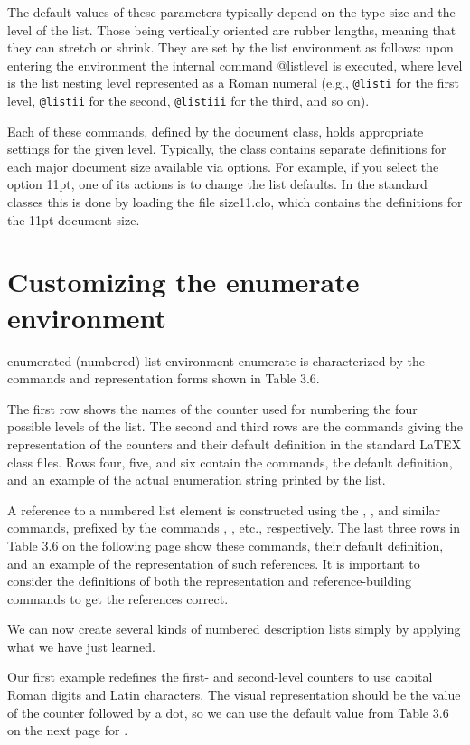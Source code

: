 The default values of these parameters typically depend on the type size and
the level of the list. Those being vertically oriented are rubber lengths, meaning
that they can stretch or shrink. They are set by the list environment as follows:
upon entering the environment the internal command @listlevel is executed,
where level is the list nesting level represented as a Roman numeral (e.g.,
\texttt{@listi} for the first level, \texttt{@listii} for the second, \texttt{@listiii} for the third, and
so on). 

Each of these commands, defined by the document class, holds appropriate
settings for the given level. Typically, the class contains separate definitions
for each major document size available via options. For example, if you select
the option 11pt, one of its actions is to change the list defaults. In the standard
classes this is done by loading the file size11.clo, which contains the definitions
for the 11pt document size.

\section{Customizing the enumerate environment}

\latex enumerated (numbered) list environment enumerate is characterized by
the commands and representation forms shown in Table 3.6.

The first row shows the names of the counter used for numbering the four possible
levels of the list. The second and third rows are the commands giving the
representation of the counters and their default definition in the standard LaTEX
class files. Rows four, five, and six contain the commands, the default definition,
and an example of the actual enumeration string printed by the list.

A reference to a numbered list element is constructed using the ,
, and similar commands, prefixed by the commands ,
, etc., respectively. The last three rows in Table 3.6 on the following
page show these commands, their default definition, and an example of the representation
of such references. It is important to consider the definitions of both the
representation and reference-building commands to get the references correct.

We can now create several kinds of numbered description lists simply by applying
what we have just learned.

Our first example redefines the first- and second-level counters to use capital
Roman digits and Latin characters. The visual representation should be the value
of the counter followed by a dot, so we can use the default value from Table 3.6
on the next page for .


